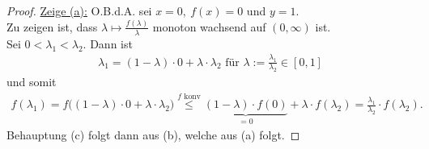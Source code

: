 \begin{proof}
		\underline{Zeige (a):} O.B.d.A. sei $x=0,~f(x)=0$ und $y=1$.\\
Zu zeigen ist, dass $\lambda\mapsto\frac{f(\lambda)}{\lambda}$ monoton wachsend auf $(0,\infty)$ ist.\\
	Sei $0<\lambda_1<\lambda_2$. 
	Dann ist 
	\begin{align*}
		\lambda_1=(1-\lambda)\cdot 0+\lambda\cdot\lambda_2\text{ für }\lambda:=\frac{\lambda_1}{\lambda_2}\in[0,1]
	\end{align*}
	und somit
	\begin{align*}
		f(\lambda_1)
		=
		f\Big((1-\lambda)\cdot0+\lambda\cdot\lambda_2\Big)
		\stackrel{f\text{ konv}}{\leq}
		\underbrace{(1-\lambda)\cdot f(0)}_{=0}+\lambda\cdot f(\lambda_2)
		=
		\frac{\lambda_1}{\lambda_2}\cdot f(\lambda_2).
	\end{align*}
	Behauptung (c) folgt dann aus (b), welche aus (a) folgt.
\end{proof}

